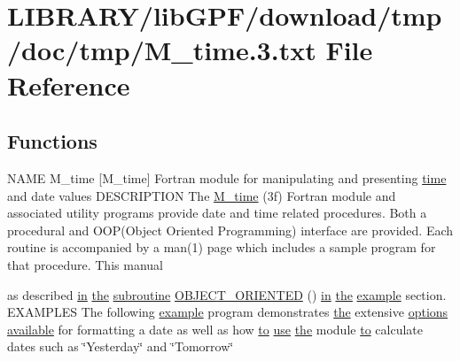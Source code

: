 \hypertarget{M__time_83_8txt}{}\section{L\+I\+B\+R\+A\+R\+Y/lib\+G\+P\+F/download/tmp/doc/tmp/\+M\+\_\+time.3.txt File Reference}
\label{M__time_83_8txt}
\subsection*{Functions}
\begin{DoxyCompactItemize}
\item 
N\+A\+ME M\+\_\+time \mbox{[}M\+\_\+time\mbox{]} Fortran module for manipulating and presenting \hyperlink{M__stopwatch_83_8txt_a1091fdf3a4e66042d1571c7e4ade98dd}{time} and date values D\+E\+S\+C\+R\+I\+P\+T\+I\+ON The \hyperlink{M__time_83_8txt_af632c02871a2248b5e1d01c3e3293704}{M\+\_\+time} (3f) Fortran module and associated utility programs provide date and time related procedures. Both a procedural and O\+O\+P(\+Object Oriented Programming) interface are provided. Each routine is accompanied by a man(1) page which includes a sample program for that procedure. This manual
\item 
as described \hyperlink{M__journal_83_8txt_afce72651d1eed785a2132bee863b2f38}{in} \hyperlink{M__stopwatch_83_8txt_a0f266597de2e57eb3aa964927bb30e14}{the} \hyperlink{M__stopwatch_83_8txt_acfbcff50169d691ff02d4a123ed70482}{subroutine} \hyperlink{M__time_83_8txt_a82d408d5c398e54b1461070b826ef70e}{O\+B\+J\+E\+C\+T\+\_\+\+O\+R\+I\+E\+N\+T\+ED} () \hyperlink{M__journal_83_8txt_afce72651d1eed785a2132bee863b2f38}{in} \hyperlink{M__stopwatch_83_8txt_a0f266597de2e57eb3aa964927bb30e14}{the} \hyperlink{option__stopwatch_83_8txt_a234fb06c9989676e2603991316e7ddc3}{example} section. E\+X\+A\+M\+P\+L\+ES The following \hyperlink{option__stopwatch_83_8txt_a234fb06c9989676e2603991316e7ddc3}{example} program demonstrates \hyperlink{M__stopwatch_83_8txt_a0f266597de2e57eb3aa964927bb30e14}{the} extensive \hyperlink{M__stopwatch_83_8txt_a13a7e26413efbcefa5920d6ba42e9d72}{options} \hyperlink{M__stopwatch_83_8txt_ab4765d078d076a26632c886ad3875761}{available} for formatting a date as well as how \hyperlink{M__stopwatch_83_8txt_a97209fd3e34ef701c0a9734280779cbb}{to} \hyperlink{intro__blas1_83_8txt_a04fa2694d85f67a675bb3f45f7241f48}{use} \hyperlink{M__stopwatch_83_8txt_a0f266597de2e57eb3aa964927bb30e14}{the} module \hyperlink{M__stopwatch_83_8txt_a97209fd3e34ef701c0a9734280779cbb}{to} calculate dates such as \char`\"{}Yesterday\char`\"{} and \char`\"{}Tomorrow\char`\"{}

\end{DoxyCompactItemize}

